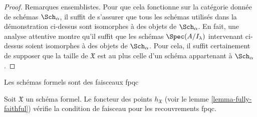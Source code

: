 \begin{proof}
\medskip\noindent
Remarques ensemblistes. Pour que cela fonctionne sur la catégorie donnée
de schémas $\Sch_\alpha$, il suffit de s'assurer que tous les
schémas utilisés dans la démonstration ci-dessus sont isomorphes à des objets de $\Sch_\alpha$.
En fait, une analyse attentive montre qu'il suffit que les
schémas $\Spec(A/I_\lambda)$ intervenant ci-dessus soient isomorphes à des
objets de $\Sch_\alpha$. Pour cela, il suffit certainement de supposer que
la taille de $\mathfrak X$ est au plus celle
d'un schéma appartenant à $\Sch_\alpha$.
\end{proof}

\begin{lemma}
\label{lemma-formal-scheme-sheaf-fppf}
\begin{slogan}
Les schémas formels sont des faisceaux fpqc
\end{slogan}
Soit $\mathfrak X$ un schéma formel. Le foncteur des points
$h_\mathfrak X$ (voir le lemme \ref{lemma-fully-faithful})
vérifie la condition de faisceau pour les recouvrements fpqc.
\end{lemma}

